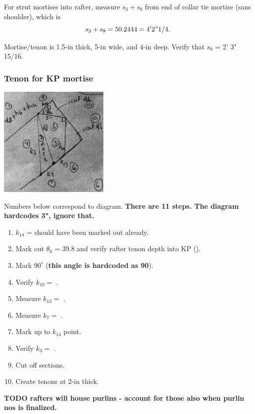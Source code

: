 \documentclass{article}\usepackage[]{graphicx}\usepackage[]{xcolor}
\begin{document}
For strut mortises into rafter, measure $s_3 + s_8$ from end of collar tie mortise (sans shoulder), which is 
\[ s_3 + s_8 = 50.2444 = 4' 2" 1/4.\]

Mortise/tenon is 1.5-in thick, 5-in wide, and 4-in deep. Verify that $s_9$ = 2' 3" 15/16. 

\subsubsection{Tenon for KP mortise}

  \begin{center}
	\includegraphics[width=0.4\textwidth]{images/rafter_layout}
\end{center}
Numbers below correspond to diagram. \textbf{There are 11 steps. The diagram hardcodes 3", ignore that.}

\vspace{0.25cm}

\begin{enumerate}
  \item $k_{14}$ =  should have been marked out already. 
  \item Mark out $\theta_6$ = 39.8 and verify rafter tenon depth into KP ().
  \item Mark $90^\circ$ (\textbf{this angle is hardcoded as 90}).
  \item Verify $k_{10} = $  .
  \item Measure $k_{13} = $ .
  \item Measure $k_7 = $ .
  \item Mark up to $k_{14}$ point.
  \item Verify $k_3 = $ .
  \item Cut off sections.
  \item Create tenons at 2-in thick. 
\end{enumerate}


\textbf{TODO rafters will house purlins - account for those also when purlin nos is finalized.}
\end{document}
